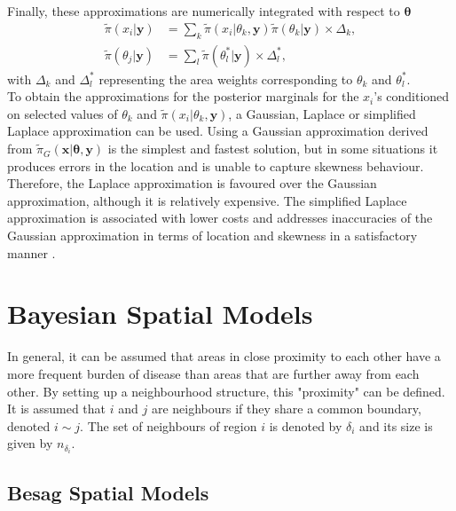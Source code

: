 Finally, these approximations are numerically integrated with respect to $\pmb{\theta}$
\begin{align}
    \widetilde{\pi}\left(x_i|\pmb{y}\right)&=\sum_k\widetilde{\pi}\left(x_i|\theta_k,\pmb{y}\right)\widetilde{\pi}\left(\theta_k|\pmb{y}\right)\times\Delta_k,\\
    \widetilde{\pi}\left(\theta_j|\pmb{y}\right)&=\sum_l\widetilde{\pi}\left(\theta_l^*|\pmb{y}\right)\times\Delta_l^*,
\end{align}
with $\Delta_k$ and $\Delta_l^*$ representing the area weights corresponding to $\theta_k$ and $\theta_l^*$. \\
To obtain the approximations for the posterior marginals for the $x_i$'s conditioned on selected values of $\theta_k$ and $\widetilde{\pi}\left(x_i|\theta_k,\pmb{y}\right)$, a Gaussian, Laplace or simplified Laplace approximation can be used. Using a Gaussian approximation derived from $\widetilde{\pi}_G\left(\pmb{x}|\pmb{\theta},\pmb{y}\right)$ is the simplest and fastest solution, but in some situations it produces errors in the location and is unable to capture skewness behaviour. Therefore, the Laplace approximation is favoured over the Gaussian approximation, although it is relatively expensive. The simplified Laplace approximation is associated with lower costs and addresses inaccuracies of the Gaussian approximation in terms of location and skewness in a satisfactory manner \autocite[][]{moraga2019geospatial}.
\clearpage
\section{Bayesian Spatial Models}
In general, it can be assumed that areas in close proximity to each other have a more frequent burden of disease than areas that are further away from each other. By setting up a neighbourhood structure, this "proximity" can be defined. It is assumed that $i$ and $j$ are neighbours if they share a common boundary, denoted $i\sim j$. The set of neighbours of region $i$ is denoted by $\delta_i$ and its size is given by $n_{\delta_i}$.
\subsection{Besag Spatial Models}
